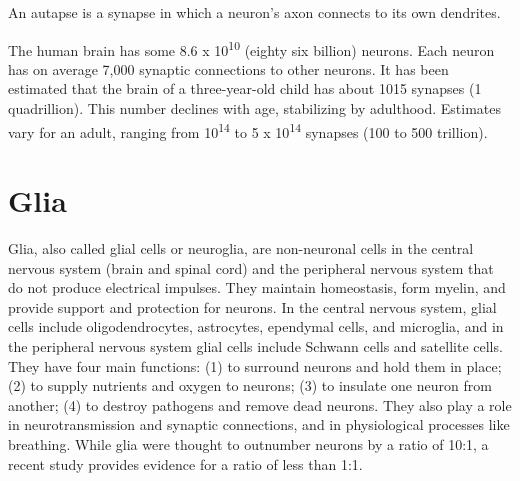 An autapse is a synapse in which a neuron's axon connects to its own dendrites.

The human brain has some 8.6 x 10\textsuperscript{10} (eighty six billion) neurons. Each neuron has on average 7,000 synaptic connections to other neurons. It has been estimated that the brain of a three-year-old child has about 1015 synapses (1 quadrillion). This number declines with age, stabilizing by adulthood. Estimates vary for an adult, ranging from 10\textsuperscript{14} to 5 x 10\textsuperscript{14} synapses (100 to 500 trillion).

\hypertarget{glia}{%
\section{Glia}\label{glia}}

Glia, also called glial cells or neuroglia, are non-neuronal cells in the central nervous system (brain and spinal cord) and the peripheral nervous system that do not produce electrical impulses. They maintain homeostasis, form myelin, and provide support and protection for neurons. In the central nervous system, glial cells include oligodendrocytes, astrocytes, ependymal cells, and microglia, and in the peripheral nervous system glial cells include Schwann cells and satellite cells. They have four main functions: (1) to surround neurons and hold them in place; (2) to supply nutrients and oxygen to neurons; (3) to insulate one neuron from another; (4) to destroy pathogens and remove dead neurons. They also play a role in neurotransmission and synaptic connections, and in physiological processes like breathing. While glia were thought to outnumber neurons by a ratio of 10:1, a recent study provides evidence for a ratio of less than 1:1.

